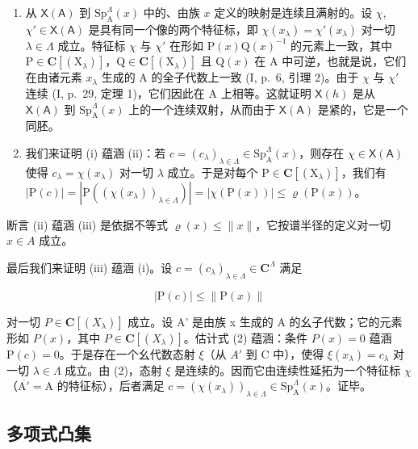 \begin{enumerate}
\def\labelenumi{\alph{enumi})}
\item
  从 \(\mathsf{X}(\mathsf{A})\) 到 \(\mathrm{Sp}_{\mathrm{A}}^{\Lambda}(x)\) 中的、由族 \(x\) 定义的映射是连续且满射的。设 \(\chi\), \(\chi' \in \mathsf{X}(\mathsf{A})\) 是具有同一个像的两个特征标，即 \(\chi(x_{\lambda}) = \chi'(x_{\lambda})\) 对一切 \(\lambda \in \Lambda\) 成立。特征标 \(\chi\) 与 \(\chi'\) 在形如 \(\mathrm{P}(x)\mathrm{Q}(x)^{-1}\) 的元素上一致，其中 \(\mathrm{P} \in \mathbf{C}[(\mathrm{X}_{\lambda})]\)，\(\mathrm{Q} \in \mathbf{C}[(\mathrm{X}_{\lambda})]\) 且 \(\mathrm{Q}(x)\) 在 A 中可逆，也就是说，它们在由诸元素 \(x_{\lambda}\) 生成的 A 的全子代数上一致 (I, p.~6, 引理 2)。由于 \(\chi\) 与 \(\chi'\) 连续 (I, p.~29, 定理 1)，它们因此在 A 上相等。这就证明 \(\mathsf{X}(h)\) 是从 \(\mathsf{X}(\mathsf{A})\) 到 \(\mathrm{Sp}_{\mathrm{A}}^{\Lambda}(x)\) 上的一个连续双射，从而由于 \(\mathsf{X}(\mathsf{A})\) 是紧的，它是一个同胚。
\item
  我们来证明 (i) 蕴涵 (ii)：若 \(c = (c_{\lambda})_{\lambda \in \Lambda} \in \mathrm{Sp}_{\mathrm{A}}^{\Lambda}(x)\)，则存在 \(\chi \in \mathsf{X}(\mathsf{A})\) 使得 \(c_{\lambda} = \chi(x_{\lambda})\) 对一切 \(\lambda\) 成立。于是对每个 \(\mathrm{P} \in \mathbf{C}[(\mathrm{X}_{\lambda})]\)，我们有 \(|\mathrm{P}(c)| = |\mathrm{P}((\chi(x_{\lambda}))_{\lambda \in \Lambda})| = |\chi(\mathrm{P}(x))| \leqslant \varrho(\mathrm{P}(x))\)。
\end{enumerate}

断言 (ii) 蕴涵 (iii) 是依据不等式 \(\varrho(x) \leqslant \|x\|\)，它按谱半径的定义对一切 \(x \in A\) 成立。

最后我们来证明 (iii) 蕴涵 (i)。设 \(c = (c_{\lambda})_{\lambda \in \Lambda} \in \mathbf{C}^{\Lambda}\) 满足

\[
| \mathrm{P} (c) | \leqslant \| \mathrm{P} (x) \|\tag{2}
\]

对一切 \(P \in \mathbf{C}[(X_{\lambda})]\) 成立。设 A' 是由族 x 生成的 A 的幺子代数；它的元素形如 \(P(x)\)，其中 \(P \in \mathbf{C}[(X_{\lambda})]\)。估计式 (2) 蕴涵：条件 \(P(x) = 0\) 蕴涵 \(\mathrm{P}(c)=0\)。于是存在一个幺代数态射 \(\xi\)（从 \(A'\) 到 C 中），使得 \(\xi(x_{\lambda})=c_{\lambda}\) 对一切 \(\lambda\in\Lambda\) 成立。由 (2)，态射 \(\xi\) 是连续的。因而它由连续性延拓为一个特征标 \(\chi\)（\(\overline{\mathrm{A}'}=\mathrm{A}\) 的特征标），后者满足 \(c=(\chi(x_{\lambda}))_{\lambda\in\Lambda}\in\mathrm{Sp}_{\mathrm{A}}^{\Lambda}(x)\)。证毕。

\subsection{多项式凸集}


